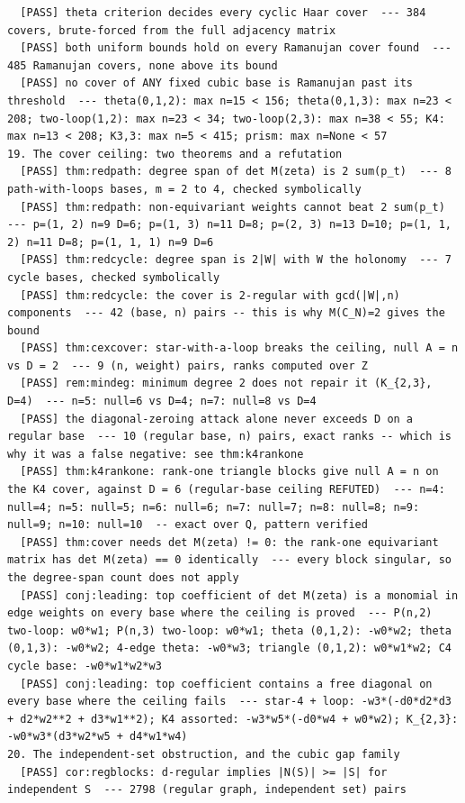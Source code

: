 \documentclass[11pt]{article}
\begin{document}
\begin{verbatim}
  [PASS] theta criterion decides every cyclic Haar cover  --- 384 covers, brute-forced from the full adjacency matrix
  [PASS] both uniform bounds hold on every Ramanujan cover found  --- 485 Ramanujan covers, none above its bound
  [PASS] no cover of ANY fixed cubic base is Ramanujan past its threshold  --- theta(0,1,2): max n=15 < 156; theta(0,1,3): max n=23 < 208; two-loop(1,2): max n=23 < 34; two-loop(2,3): max n=38 < 55; K4: max n=13 < 208; K3,3: max n=5 < 415; prism: max n=None < 57
19. The cover ceiling: two theorems and a refutation
  [PASS] thm:redpath: degree span of det M(zeta) is 2 sum(p_t)  --- 8 path-with-loops bases, m = 2 to 4, checked symbolically
  [PASS] thm:redpath: non-equivariant weights cannot beat 2 sum(p_t)  --- p=(1, 2) n=9 D=6; p=(1, 3) n=11 D=8; p=(2, 3) n=13 D=10; p=(1, 1, 2) n=11 D=8; p=(1, 1, 1) n=9 D=6
  [PASS] thm:redcycle: degree span is 2|W| with W the holonomy  --- 7 cycle bases, checked symbolically
  [PASS] thm:redcycle: the cover is 2-regular with gcd(|W|,n) components  --- 42 (base, n) pairs -- this is why M(C_N)=2 gives the bound
  [PASS] thm:cexcover: star-with-a-loop breaks the ceiling, null A = n vs D = 2  --- 9 (n, weight) pairs, ranks computed over Z
  [PASS] rem:mindeg: minimum degree 2 does not repair it (K_{2,3}, D=4)  --- n=5: null=6 vs D=4; n=7: null=8 vs D=4
  [PASS] the diagonal-zeroing attack alone never exceeds D on a regular base  --- 10 (regular base, n) pairs, exact ranks -- which is why it was a false negative: see thm:k4rankone
  [PASS] thm:k4rankone: rank-one triangle blocks give null A = n on the K4 cover, against D = 6 (regular-base ceiling REFUTED)  --- n=4: null=4; n=5: null=5; n=6: null=6; n=7: null=7; n=8: null=8; n=9: null=9; n=10: null=10  -- exact over Q, pattern verified
  [PASS] thm:cover needs det M(zeta) != 0: the rank-one equivariant matrix has det M(zeta) == 0 identically  --- every block singular, so the degree-span count does not apply
  [PASS] conj:leading: top coefficient of det M(zeta) is a monomial in edge weights on every base where the ceiling is proved  --- P(n,2) two-loop: w0*w1; P(n,3) two-loop: w0*w1; theta (0,1,2): -w0*w2; theta (0,1,3): -w0*w2; 4-edge theta: -w0*w3; triangle (0,1,2): w0*w1*w2; C4 cycle base: -w0*w1*w2*w3
  [PASS] conj:leading: top coefficient contains a free diagonal on every base where the ceiling fails  --- star-4 + loop: -w3*(-d0*d2*d3 + d2*w2**2 + d3*w1**2); K4 assorted: -w3*w5*(-d0*w4 + w0*w2); K_{2,3}: -w0*w3*(d3*w2*w5 + d4*w1*w4)
20. The independent-set obstruction, and the cubic gap family
  [PASS] cor:regblocks: d-regular implies |N(S)| >= |S| for independent S  --- 2798 (regular graph, independent set) pairs

\end{verbatim}
\end{document}
